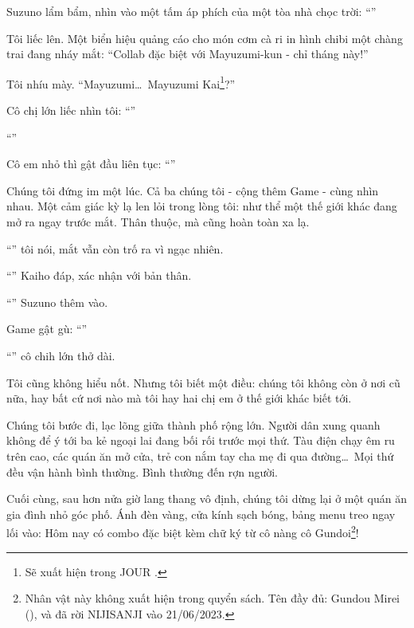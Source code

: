 \documentclass[../main.tex]{subfiles}
\begin{document}
Suzuno lẩm bẩm, nhìn vào một tấm áp phích của một tòa nhà chọc trời: ``''

Tôi liếc lên. Một biển hiệu quảng cáo cho món cơm cà ri in hình chibi một chàng trai đang nháy mắt: ``Collab đặc biệt với Mayuzumi-kun - chỉ tháng này!''

Tôi nhíu mày. ``Mayuzumi\dots\ Mayuzumi Kai\footnote{Sẽ xuất hiện trong {\flaregothic JOUR }.}?''

Cô chị lớn liếc nhìn tôi: ``''

``''

Cô em nhỏ thì gật đầu liên tục: ``''

Chúng tôi đứng im một lúc. Cả ba chúng tôi - cộng thêm Game - cùng nhìn nhau. Một cảm giác kỳ lạ len lỏi trong lòng tôi: như thể một thế giới khác đang mở ra ngay trước mắt. Thân thuộc, mà cũng hoàn toàn xa lạ.

``'' tôi nói, mắt vẫn còn trố ra vì ngạc nhiên.

``'' Kaiho đáp, xác nhận với bản thân.

``'' Suzuno thêm vào.

Game gật gù: ``''

``'' cô chih lớn thở dài.

Tôi cũng không hiểu nốt. Nhưng tôi biết một điều: chúng tôi không còn ở nơi cũ nữa, hay bất cứ nơi nào mà tôi hay hai chị em ở thế giới khác biết tới.

Chúng tôi bước đi, lạc lõng giữa thành phố rộng lớn. Người dân xung quanh không để ý tới ba kẻ ngoại lai đang bối rối trước mọi thứ. Tàu điện chạy êm ru trên cao, các quán ăn mở cửa, trẻ con nắm tay cha mẹ đi qua đường\dots\ Mọi thứ đều vận hành bình thường. Bình thường đến rợn người.

Cuối cùng, sau hơn nửa giờ lang thang vô định, chúng tôi dừng lại ở một quán ăn gia đình nhỏ góc phố. Ánh đèn vàng, cửa kính sạch bóng, bảng menu treo ngay lối vào: Hôm nay có combo đặc biệt kèm chữ ký từ cô nàng cô Gundoi\footnote{Nhân vật này không xuất hiện trong quyển sách. Tên đầy đủ: Gundou Mirei (), và đã rời NIJISANJI vào 21/06/2023.}!
\end{document}
